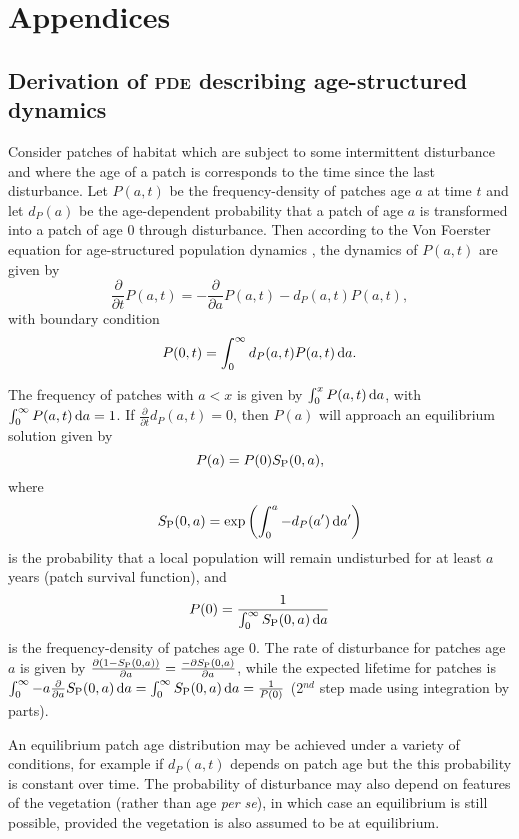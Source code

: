 \documentclass[10pt,twoside]{article}
\begin{document}
\section{Appendices}\label{appendices}

\subsection{Derivation of \textsc{pde} describing age-structured
dynamics}\label{derivation-of-pde-describing-age-structured-dynamics}

Consider patches of habitat which are subject to some intermittent
disturbance and where the age of a patch is corresponds to the time
since the last disturbance. Let \(P(a, t)\) be the frequency-density of
patches age \(a\) at time \(t\) and let \(d_P(a)\) be the
age-dependent probability that a patch of age \(a\) is transformed into
a patch of age \(0\) through disturbance. Then according to the Von
Foerster equation for age-structured population dynamics
\citep{Vonfoerster-1959}, the dynamics of \(P(a, t)\) are given by
\[ \frac{\partial}{\partial t} P(a, t) = -\frac{\partial}{\partial a} P(a, t)-d_P(a, t) P(a, t),\]
with boundary condition
\[ P(0, t) = \int^{\infty}_{0}d_P(a, t) P(a, t) \, {\rm d}a.\]

The frequency of patches with \(a < x\) is given by
\(\int_{0}^{x}P(a, t) \, {\rm d}a\), with
\(\int_{0}^{\infty} P(a, t) \, {\rm d}a = 1\). If
\(\frac{\partial}{\partial t}d_P(a, t) = 0\), then \(P(a)\) will
approach an equilibrium solution given by \[P(a) = P(0) S_{\rm P}(0, a),\] where
\[S_{\rm P}(0, a) = \exp \left( \int_{0}^{a}-d_P(a^\prime) \, {\rm d}a^\prime\right)\]
is the probability that a local population will remain undisturbed for
at least \(a\) years (patch survival function), and
\[P(0) = \frac1{ \int_{0}^{\infty}S_{\rm P}(0, a) \, {\rm d}a}\] is the
frequency-density of patches age 0. The rate of disturbance for patches
age \(a\) is given by
\(\frac{\partial (1-S_{\rm P}(0, a))}{\partial a} = \frac{-\partial S_{\rm P}(0, a)}{\partial a}\),
while the expected lifetime for patches is
\(\int_0^\infty - a \frac{\partial}{\partial a} S_{\rm P}(0, a) \, {\rm d} a = \int_0^\infty S_{\rm P}(0, a) \, {\rm d} a = \frac1{P(0)}\)
(2\(^{nd}\) step made using integration by parts).

An equilibrium patch age distribution may be achieved under a variety of
conditions, for example if \(d_P(a, t)\) depends on patch age but the
this probability is constant over time. The probability of disturbance
may also depend on features of the vegetation (rather than age \emph{per
se}), in which case an equilibrium is still possible, provided the
vegetation is also assumed to be at equilibrium.
\end{document}
